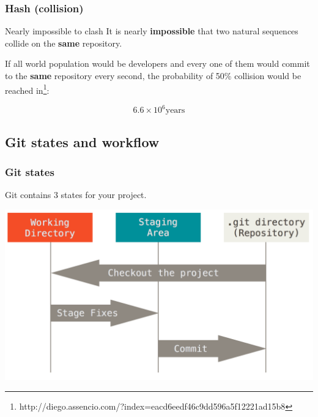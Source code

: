 \begin{frame}
  \frametitle{Hash (collision)}

  \begin{block}{Nearly impossible to clash}
    It is nearly \textbf{impossible} that two natural sequences collide on the
    \textbf{same} repository.
  \end{block}

  \vspace{2em}

  If all world population would be developers and every one of them would
  commit to the \textbf{same} repository every second, the probability of 50\%
  collision would be reached in\footnote{http://diego.assencio.com/?index=eacd6eedf46c9dd596a5f12221ad15b8}:

  \[
    6.6 \times 10^6 \text{years}
  \]

\end{frame}

\subsection{Git states and workflow}

\begin{frame}
  \frametitle{Git states}

  Git contains 3 states for your project.

  \vspace{1em}

  \begin{center}
    \includegraphics[width=0.9\linewidth]{figures/git-areas}
  \end{center}

\end{frame}


